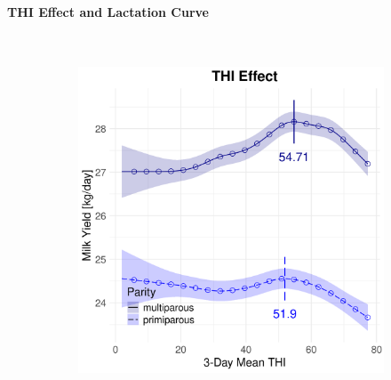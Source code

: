 \newpage
\paragraph{THI Effect and Lactation Curve} \quad \\
\begin{figure}[H]
    \centering
    \begin{subfigure}[b]{0.45\textwidth}
        \centering
        \includegraphics[width=\textwidth]{thesis/figures/models/milk/full/ho_milk_full/ho_milk_full_marginal_thi_milk_combined.png}
    \end{subfigure}
    \hspace{0.05\textwidth} %
    \begin{subfigure}[b]{0.45\textwidth}
        \centering

\end{subfigure}
\end{figure}
